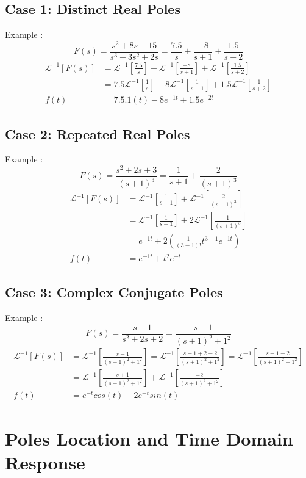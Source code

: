 \documentclass[12pt,a4paper]{article}
\begin{document}
	\subsection{Case 1: Distinct Real Poles}
	Example :
	\[
	F(s) = \frac{s^2+8s+15}{s^3+3s^2+2s} = \frac{7.5}{s} + \frac{-8}{s+1} + \frac{1.5}{s+2}
	\]
	\[
	\begin{split}
		\mathcal{L}^{-1}[F(s)] &= \mathcal{L}^{-1}[\frac{7.5}{s}] + \mathcal{L}^{-1}[\frac{-8}{s+1}] + \mathcal{L}^{-1}[\frac{1.5}{s+2}] \\
		&= 7.5\mathcal{L}^{-1}[\frac{1}{s}] -8\mathcal{L}^{-1}[\frac{1}{s+1}] + 1.5\mathcal{L}^{-1}[\frac{1}{s+2}] \\
		f(t) &= 7.5.1(t) -8e^{-1t} + 1.5e^{-2t}
	\end{split}
	\]
	\subsection{Case 2: Repeated Real Poles}
	Example :
	\[
	F(s) = \frac{s^2+2s+3}{(s+1)^3} = \frac{1}{s+1} + \frac{2}{(s+1)^3}
	\]
	\[
	\begin{split}
		\mathcal{L}^{-1}[F(s)] &= \mathcal{L}^{-1}[\frac{1}{s+1}] + \mathcal{L}^{-1}[\frac{2}{(s+1)^3}] \\
		&= \mathcal{L}^{-1}[\frac{1}{s+1}] + 2\mathcal{L}^{-1}[\frac{1}{(s+1)^3}] \\
		&= e^{-1t} + 2(\frac{1}{(3-1)!}t^{3-1}e^{-1t}) \\
		f(t) &= e^{-1t} + t^2e^{-t}
	\end{split}
	\]
	\subsection{Case 3: Complex Conjugate Poles}
	Example :
	\[
	F(s) = \frac{s-1}{s^2+2s+2} = \frac{s-1}{(s+1)^2+1^2}
	\]
	\[
	\begin{split}
		\mathcal{L}^{-1}[F(s)] &= \mathcal{L}^{-1}[\frac{s-1}{(s+1)^2+1^2}] = \mathcal{L}^{-1}[\frac{s-1+2-2}{(s+1)^2+1^2}] = \mathcal{L}^{-1}[\frac{s+1-2}{(s+1)^2+1^2}] \\
		&= \mathcal{L}^{-1}[\frac{s+1}{(s+1)^2+1^2}] + \mathcal{L}^{-1}[\frac{-2}{(s+1)^2+1^2}] \\
		f(t) &= e^{-t} cos(t) - 2e^{-t} sin(t)
	\end{split}
	\]
	
	\break
	
	\section{Poles Location and Time Domain Response}
	
\end{document}
